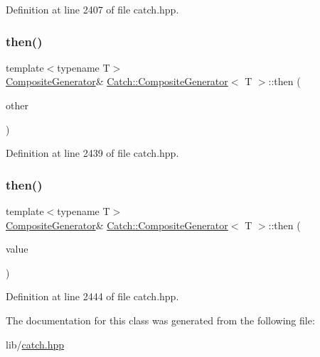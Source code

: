 Definition at line 2407 of file catch.\+hpp.

\hypertarget{class_catch_1_1_composite_generator_a2e03f42df85cdd238aabd77a80b075d5}{}\label{class_catch_1_1_composite_generator_a2e03f42df85cdd238aabd77a80b075d5} 
\subsubsection{\texorpdfstring{then()}{then()}\hspace{0.1cm}{\footnotesize\ttfamily [1/2]}}
{\footnotesize\ttfamily template$<$typename T$>$ \\
\hyperlink{class_catch_1_1_composite_generator}{Composite\+Generator}\& \hyperlink{class_catch_1_1_composite_generator}{Catch\+::\+Composite\+Generator}$<$ T $>$\+::then (\begin{DoxyParamCaption}\item[{\hyperlink{class_catch_1_1_composite_generator}{Composite\+Generator}$<$ T $>$ \&}]{other }\end{DoxyParamCaption})\hspace{0.3cm}{\ttfamily [inline]}}



Definition at line 2439 of file catch.\+hpp.

\hypertarget{class_catch_1_1_composite_generator_aefdc11bcfccdf07d2db5f0da3ed8758c}{}\label{class_catch_1_1_composite_generator_aefdc11bcfccdf07d2db5f0da3ed8758c} 
\subsubsection{\texorpdfstring{then()}{then()}\hspace{0.1cm}{\footnotesize\ttfamily [2/2]}}
{\footnotesize\ttfamily template$<$typename T$>$ \\
\hyperlink{class_catch_1_1_composite_generator}{Composite\+Generator}\& \hyperlink{class_catch_1_1_composite_generator}{Catch\+::\+Composite\+Generator}$<$ T $>$\+::then (\begin{DoxyParamCaption}\item[{T}]{value }\end{DoxyParamCaption})\hspace{0.3cm}{\ttfamily [inline]}}



Definition at line 2444 of file catch.\+hpp.



The documentation for this class was generated from the following file\+:\begin{DoxyCompactItemize}
\item 
lib/\hyperlink{catch_8hpp}{catch.\+hpp}\end{DoxyCompactItemize}

